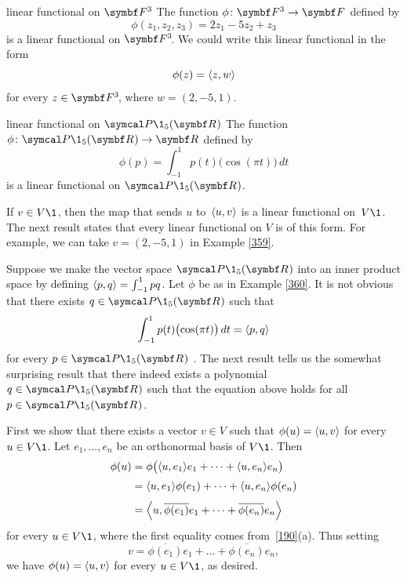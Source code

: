 \begin{example}[359]{linear functional on\/ $\F{3}$}
The function
$\phi \colon \F{3} \rightarrow \F{}$ defined by
\[
\phi(z_1, z_2, z_3) = 2 z_1 - 5 z_2 + z_3
\]
is a linear functional on $\FF{3}$. We could write this linear functional in the form
\[
\phi(z) = \ip{z, w}
\]
for every $z \in \FF3$, where $w = (2, -5, 1)$.
\end{example}

\begin{example}[360]{linear functional on\/ $\P\1_5(\R{})$}
The function $\phi \colon \P\1_5(\R{}) \rightarrow \R{}$ defined by
\[
\phi(p) = \int_{-1}^1 p(t) \bigl(\cos(\pi t)\bigr)\,dt
\]
is a linear functional on $\P\1_5(\R{})$.
\end{example}


If $v \in V\1$, then the map that sends $u$ to~$\ip{u,v}$ is a linear functional
on~$V\1$. The next result states  that every linear functional on $V$ is of this form. For example, we can take $v = (2, -5, 1)$ in Example \ref{359}.

Suppose we make the vector space $\P\1_5(\R{})$ into an inner product space by defining $\ip{p, q} = \int_{-1}^{1} pq$. Let $\phi$ be as in Example \ref{360}. It is not obvious that there exists $q \in \P\1_5(\R{})$ such that
\[
\int_{-1}^1 p(t) \bigl(\cos(\pi t)\bigr)\,dt = \ip{p, q}
\]
for every $p \in \P\1_5(\R{})$ . The next result tells us the somewhat surprising result that there indeed exists a polynomial $q \in \P\1_5(\R{})$ such that the equation above holds for all $p \in \P\1_5(\R{})$.


\proof
First we show that there exists a vector $v \in V$ such that $\phi(u) = \ip{u, v}$ for every $u \in V\1$.  Let $e_1, \dots, e_n$ be an orthonormal basis of $V\1$.  Then
\begin{align*}
\phi(u) &=
\phi\paren[\big]{\ip{u, e_1} e_1 + \dots + \ip{u, e_n} e_n} \\[3bp]
&= \ip{u, e_1} \phi(e_1) + \dots + \ip{u, e_n} \phi(e_n)  \\[3bp]
&= \ip[\Big]{u, \overline{\phi(e_1)} e_1  + \dots + \overline{\phi(e_n)} e_n}
\end{align*}
for every $u \in V\1$, where the first equality comes from~\ref{190}(a).  Thus
setting
\begin{equation} \label{GSformula}
v = \overline{\phi(e_1)} e_1  + \dots +
\overline{\phi(e_n)} e_n,
\end{equation}%
we have $\phi(u) = \ip{u, v}$ for every $u \in V\1$, as desired.

